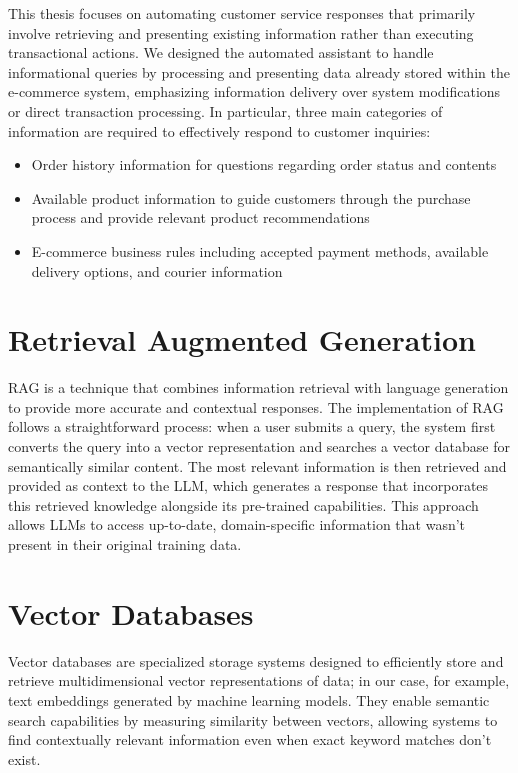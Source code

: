 This thesis focuses on automating customer service responses that primarily involve retrieving and presenting existing information rather than executing transactional actions.
We designed the automated assistant to handle informational queries by processing and presenting data already stored within the e-commerce system, emphasizing information delivery over system modifications or direct transaction processing.
In particular, three main categories of information are required to effectively respond to customer inquiries:
\begin{itemize}
    \item Order history information for questions regarding order status and contents
    \item Available product information to guide customers through the purchase process and provide relevant product recommendations
    \item E-commerce business rules including accepted payment methods, available delivery options, and courier information
\end{itemize}

\section{Retrieval Augmented Generation}
\label{sec:rag}

RAG is a technique that combines information retrieval with language generation to provide more accurate and contextual responses.
The implementation of RAG follows a straightforward process: when a user submits a query, the system first converts the query into a vector representation and searches a vector database for semantically similar content.
The most relevant information is then retrieved and provided as context to the LLM, which generates a response that incorporates this retrieved knowledge alongside its pre-trained capabilities.
This approach allows LLMs to access up-to-date, domain-specific information that wasn't present in their original training data.

\section{Vector Databases}
\label{sec:vecdb}

Vector databases are specialized storage systems designed to efficiently store and retrieve multidimensional vector representations of data; in our case, for example, text embeddings generated by machine learning models.
They enable semantic search capabilities by measuring similarity between vectors, allowing systems to find contextually relevant information even when exact keyword matches don't exist.

